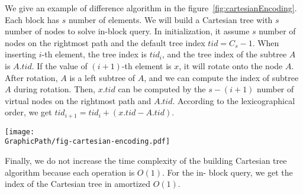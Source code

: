 \iffalse 為了解決在線詢問操作，取 $s = \frac{\log n}{4}$。根據字典順序
的編碼性質，一開始建立虛設點 $s$ 個在右鏈上，其樹編號 $\mathit{tid} =
C_s - 1$ 。隨著插入元素的增加，尚未加入的元素都預設嚴格遞減，加上根據
編碼順序，我們藉由差值來維護在線編碼 (如圖
~\ref{fig:cartesianEncoding})。根據上述的編碼想法，我們得到算法
~\ref{alg:cartesian-encode-online}。\fi

We give an example of difference algorithm in the
figure~\ref{fig:cartesianEncoding}.  Each block has $s$ number of
elements.  We will build a Cartesian tree with $s$ number of nodes to
solve in-block query.  In initialization, it assume $s$ number of nodes
on the rightmost path and the default tree index $\mathit{tid} = C_s -
1$.  When inserting $i$-th element, the tree index is $\mathit{tid}_i$,
and the tree index of the subtree $A$ is $A.\mathit{tid}$.  If the value
of $(i+1)$-th element is $x$, it will rotate onto the node $A$.  After
rotation, $A$ is a left subtree of $A$, and we can compute the index of
subtree $A$ during rotation.  Then, $x.\mathit{tid}$ can be computed by
the $s-(i+1)$ number of virtual nodes on the rightmost path and
$A.\mathit{tid}$.  According to the lexicographical order, we get
$\mathit{tid}_{i+1} = \mathit{tid}_i + (x.\mathit{tid} -
A.\mathit{tid})$.



\begin{figure*}[!thb]
  \centering
  \texttt{[image: \\GraphicPath/fig-cartesian-encoding.pdf]}

  \caption{An example for difference algorithm to encode Cartesian tree.}

  \label{fig:cartesianEncoding}
\end{figure*}

Finally, we do not increase the time complexity of the building
Cartesian tree algorithm because each operation is $O(1)$.  For the in-
block query, we get the index of the Cartesian tree in amortized $O(1)$.

\iffalse
最後，我們不改變原本的建立笛卡爾樹算法，便能在過程中擭得樹的編號，
每一次的 in-block 詢問只需要一次記憶體存取，得到任一操作攤銷複雜度 $\theta(1)$。
\fi
